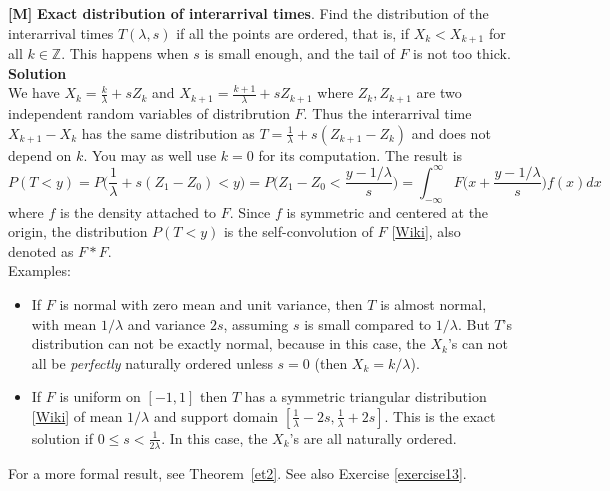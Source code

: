 \documentclass[10pt]{article}
\begin{document}
\begin{Exercise}\label{exercise8}
{\bf [M]}  {\bf Exact distribution of interarrival times}. Find the distribution of the \textcolor{index}{interarrival times} $T(\lambda,s)$ if all the points are ordered, that is, if $X_k<X_{k+1}$ for all $k\in\mathbb{Z}$. This
happens when $s$ is small enough, and the tail of $F$ is not too thick.\vspace{1ex} \\
{\bf Solution} \vspace{1ex}   \\ 
We have $X_k = \frac{k}{\lambda} + s Z_k$ and $X_{k+1} = \frac{k+1}{\lambda} + s Z_{k+1}$ where $Z_k,Z_{k+1}$ are two independent random variables of distribrution $F$. Thus the interarrival time $X_{k+1}-X_{k}$ has the same distribution as $T=\frac{1}{\lambda}+ s(Z_{k+1}-Z_k)$ and does not depend on $k$. You may as well use $k=0$ for its computation. The result is
$$P(T<y)=P\Big(\frac{1}{\lambda}+ s(Z_{1}-Z_0)<y\Big)=P\Big(Z_{1}-Z_0<\frac{y-1/\lambda}{s}\Big)=\int_{-\infty}^\infty F\Big(x+\frac{y-1/\lambda}{s}\Big)f(x)dx$$
where $f$ is the density attached to $F$.  Since $f$ is symmetric and centered at the origin, the distribution $P(T<y)$ is the \textcolor{index}{self-convolution} of $F$ 
[\href{https://en.wikipedia.org/wiki/Convolution_of_probability_distributions}{Wiki}], also denoted as $F * F$.   \vspace{1ex} \\
Examples: 
\begin{itemize}
\item If $F$ is normal with zero mean and unit variance, then $T$ is almost normal, with mean $1/\lambda$ and variance $2s$, assuming $s$ is small compared to $1/\lambda$. But $T$'s distribution can not be exactly normal, because in this case, the $X_k$'s can not all be {\em perfectly} naturally ordered unless $s=0$ (then $X_k=k/\lambda$).  
\item If $F$ is uniform on $[-1,1]$ then $T$ has a symmetric \textcolor{index}{triangular distribution} [\href{https://en.wikipedia.org/wiki/Triangular_distribution}{Wiki}] of mean $1/\lambda$ and support domain $[\frac{1}{\lambda}-2s, \frac{1}{\lambda}+2s]$. This is the exact solution if $0\leq s < \frac{1}{2\lambda}$. In this case, the $X_k$'s are all naturally ordered.
\end{itemize}
For a more formal result, see Theorem~\ref{et2}. See also Exercise \ref{exercise13}.
\end{Exercise} 
\end{document}
